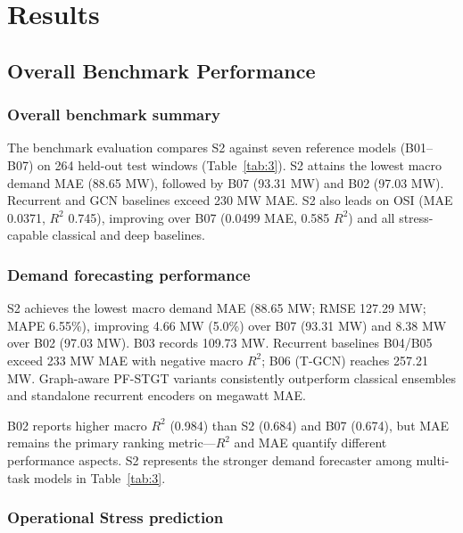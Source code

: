 \section{Results}\label{sec:results}

\subsection{Overall Benchmark Performance}\label{subsection:overall_benchmark_performance}

\subsubsection{Overall benchmark summary}\label{subsubsection:overall_benchmark_summary}

The benchmark evaluation compares S2 against seven reference models (B01--B07) on 264 held-out test windows (Table~\ref{tab:3}). S2 attains the lowest macro demand MAE (88.65 MW), followed by B07 (93.31 MW) and B02 (97.03 MW). Recurrent and GCN baselines exceed 230 MW MAE. S2 also leads on OSI (MAE 0.0371, $R^2$ 0.745), improving over B07 (0.0499 MAE, 0.585 $R^2$) and all stress-capable classical and deep baselines.

\subsubsection{Demand forecasting performance}\label{subsubsection:demand_forecasting_performance}

S2 achieves the lowest macro demand MAE (88.65 MW; RMSE 127.29 MW; MAPE 6.55\%), improving 4.66 MW (5.0\%) over B07 (93.31 MW) and 8.38 MW over B02 (97.03 MW). B03 records 109.73 MW. Recurrent baselines B04/B05 exceed 233 MW MAE with negative macro $R^2$; B06 (T-GCN) \cite{Zhao2020TGCN} reaches 257.21 MW. Graph-aware PF-STGT variants consistently outperform classical ensembles and standalone recurrent encoders on megawatt MAE.

B02 reports higher macro $R^2$ (0.984) than S2 (0.684) and B07 (0.674), but MAE remains the primary ranking metric---$R^2$ and MAE quantify different performance aspects. S2 represents the stronger demand forecaster among multi-task models in Table~\ref{tab:3}.

\subsubsection{Operational Stress prediction}\label{subsubsection:operational_stress_prediction}

